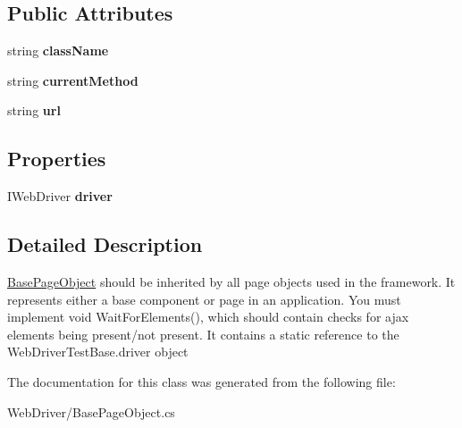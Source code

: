 \subsection*{Public Attributes}
\begin{DoxyCompactItemize}
\item 
\hypertarget{class_proto_test_1_1_golem_1_1_web_driver_1_1_base_page_object_a08cbd81fcffc26d95360b1a3381ed4a7}{string {\bfseries class\-Name}}\label{class_proto_test_1_1_golem_1_1_web_driver_1_1_base_page_object_a08cbd81fcffc26d95360b1a3381ed4a7}

\item 
\hypertarget{class_proto_test_1_1_golem_1_1_web_driver_1_1_base_page_object_ae80f5a12ff49f35615d8f84ff654aaa5}{string {\bfseries current\-Method}}\label{class_proto_test_1_1_golem_1_1_web_driver_1_1_base_page_object_ae80f5a12ff49f35615d8f84ff654aaa5}

\item 
\hypertarget{class_proto_test_1_1_golem_1_1_web_driver_1_1_base_page_object_ab2c1e267fc003442b899b473ea538dec}{string {\bfseries url}}\label{class_proto_test_1_1_golem_1_1_web_driver_1_1_base_page_object_ab2c1e267fc003442b899b473ea538dec}

\end{DoxyCompactItemize}
\subsection*{Properties}
\begin{DoxyCompactItemize}
\item 
\hypertarget{class_proto_test_1_1_golem_1_1_web_driver_1_1_base_page_object_a416b2550084ce74a891415a6c37819c7}{I\-Web\-Driver {\bfseries driver}}\label{class_proto_test_1_1_golem_1_1_web_driver_1_1_base_page_object_a416b2550084ce74a891415a6c37819c7}

\end{DoxyCompactItemize}


\subsection{Detailed Description}
\hyperlink{class_proto_test_1_1_golem_1_1_web_driver_1_1_base_page_object}{Base\-Page\-Object} should be inherited by all page objects used in the framework. It represents either a base component or page in an application. You must implement void Wait\-For\-Elements(), which should contain checks for ajax elements being present/not present. It contains a static reference to the Web\-Driver\-Test\-Base.\-driver object 



The documentation for this class was generated from the following file\-:\begin{DoxyCompactItemize}
\item 
Web\-Driver/Base\-Page\-Object.\-cs\end{DoxyCompactItemize}

